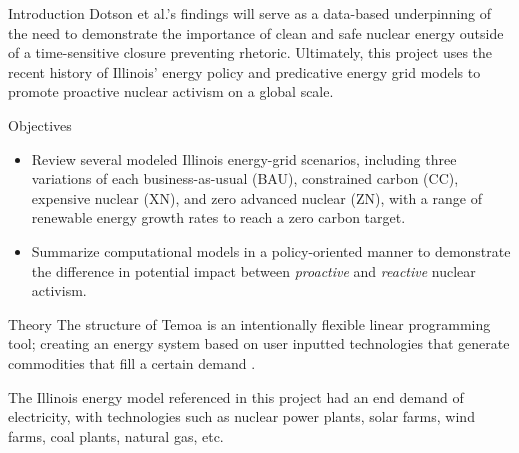 \documentclass[final]{beamer}
\newlength{\onecolwid}
\newlength{\threecolwid}
\begin{document}
\begin{frame}[t]
\begin{columns}[t,totalwidth=\threecolwid]
\begin{column}{\onecolwid}
\begin{block}{Introduction}
	Dotson et al.'s findings will serve as a data-based underpinning of the need to demonstrate the importance of clean and safe nuclear energy outside of a time-sensitive closure preventing rhetoric. Ultimately, this project uses the recent history of Illinois' energy policy and predicative energy grid models to promote proactive nuclear activism on a global scale.
	\vspace{0.7em}
	
	
	\end{block}
	
	
	\begin{alertblock}{Objectives}
	\begin{itemize}
			\item Review several modeled Illinois energy-grid scenarios, including three variations of each business-as-usual (BAU), constrained carbon (CC), expensive nuclear (XN), and zero advanced nuclear (ZN), with a range of renewable energy growth rates to reach a zero carbon target.
		\item Summarize computational models in a policy-oriented manner to demonstrate the difference in potential impact between \textit{proactive} and \textit{reactive} nuclear activism.
	\end{itemize}
	
	\end{alertblock}


\begin{block}{Theory}
The structure of Temoa is an intentionally flexible linear programming tool; creating an energy system based on user inputted technologies that generate commodities that fill a certain demand \cite{decarolis}. 
\vspace{0.7em}

The Illinois energy model referenced in this project had an end demand of electricity, with technologies such as nuclear power plants, solar farms, wind farms, coal plants, natural gas, etc. 
\vspace{0.7em}


\end{block}
\end{column}
\end{columns}
\end{frame}
\end{document}
